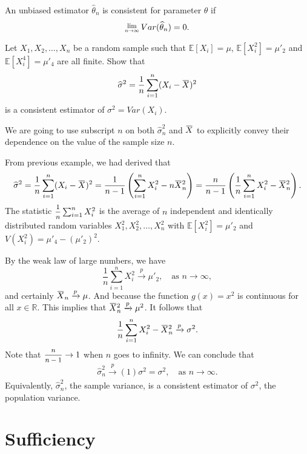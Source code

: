 \begin{theorem}
    An unbiased estimator $\widehat{\theta}_n$ is consistent for parameter $\theta$ if
    \begin{equation}
        \Lim{n \to \infty} Var(\widehat{\theta}_n) = 0.
    \end{equation}
\end{theorem}

\begin{example}
    Let $X_1, X_2, \ldots, X_n$ be a random sample such that $\mathbb{E}[X_i] = \mu$, $\mathbb{E}[X^2_i] = \mu'_2$ and 
    $\mathbb{E}[X^4_i] = \mu'_4$ are all finite. Show that 
    \[
        \widehat{\sigma}^2 = \frac{1}{n} \sum_{i=1}^n (X_i - \ols{X})^2
    \]
    is a consistent estimator of $\sigma^2 = Var(X_i)$.
\end{example}
\begin{solution}
    We are going to use subscript $n$ on both $\widehat{\sigma}^2_n$ and $\ols{X}$ to explicitly 
    convey their dependence on the value of the sample size $n$.
    
    From previous example, we had derived that 
    \[
        \widehat{\sigma}^2 = \frac{1}{n} \sum_{i=1}^n (X_i - \ols{X})^2
        = \frac{1}{n-1} \left( \sum_{i=1}^n X^2_i - n \ols{X}_n^2 \right)
        = \frac{n}{n-1} \left( \frac{1}{n} \sum_{i=1}^n X^2_i - \ols{X}_n^2 \right).
    \]
    The statistic $\mfrac{1}{n} \sum_{i=1}^n X^2_i$ is the average of $n$ independent 
    and identically distributed random variables $X^2_1, X^2_2, \ldots, X^2_n$ with 
    $\mathbb{E} [X^2_i] = \mu'_2$ and $V(X^2_i) = \mu'_4 - (\mu'_2)^2$. 

    By the weak law of large numbers, we have
    \[
        \frac{1}{n} \sum_{i=1}^{n}X_i^2 \xrightarrow[]{p} \mu'_2, \quad \text{as } n \to \infty,
    \]
    and certainly $\ols{X}_n \xrightarrow[]{p} \mu$. And because the function $g(x) = x^2$ is continuous 
    for all $x \in \mathbb{R}$. This implies that $\ols{X}^2_n \xrightarrow[]{p} \mu^2$. It follows that 
    \[
        \frac{1}{n} \sum_{i=1}^n X^2_i - \ols{X}_n^2 \xrightarrow[]{p} \sigma^2.
    \]
    Note that $\mfrac{n}{n-1} \to 1$ when $n$ goes to infinity. We can conclude that 
    \[
        \widehat{\sigma}^2_n \xrightarrow[]{p} (1)\sigma^2 = \sigma^2, \quad \text{as } n \to \infty.
    \]
    Equivalently, $\widehat{\sigma}^2_n$, the sample variance, is a consistent estimator of $\sigma^2$,
    the population variance.
\end{solution}

\section{Sufficiency}

